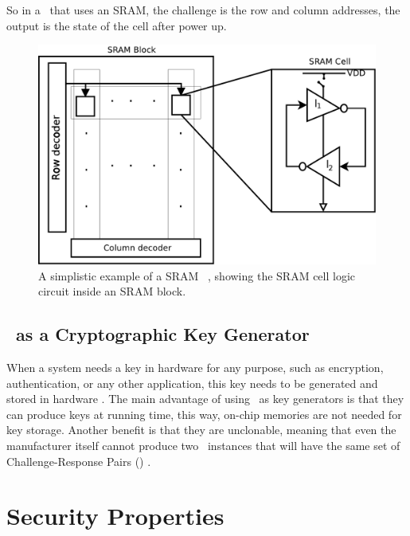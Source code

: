 So in a \puf~that uses an SRAM, the challenge is the row and column addresses, the output is the state of the cell after power up.
\begin{figure}[!ht]
	\centering
	\includegraphics[scale=0.42]{figures/pdf/spuf}
	\caption{A simplistic example of a SRAM \puf~, showing the SRAM cell logic circuit inside an SRAM block.}
	\label{fig:spufexample}
\end{figure}


\subsection{\puf~as a Cryptographic  Key Generator }
When a system needs a key in hardware for any purpose, such as encryption, authentication, or any other application, this key needs to be generated and stored in hardware \cite{puf-key-devadas-1278484}. The main advantage of using \pufs~as key generators is that they can produce keys at running time, this way, on-chip memories are not needed for key storage. Another benefit is that they are unclonable, meaning that even the manufacturer itself cannot produce two \puf~instances that will have the same set of Challenge-Response Pairs (\crps) \cite{Gassend2002:PUFs}.


\section{Security Properties}
\label{sec:securityproperties}

